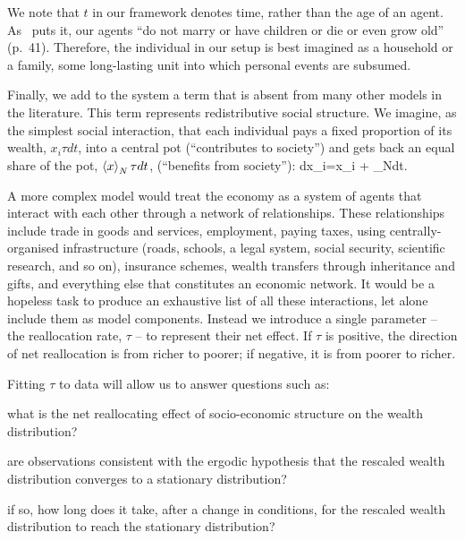 We note that $t$ in our framework denotes time, rather than the age of an agent. As~\cite{meade1964efficiency} puts it, our agents ``do not marry or have children or die or even grow old'' (p.~41). Therefore, the individual in our setup is best imagined as a household or a family, \ie some long-lasting unit into which personal events are subsumed.

Finally, we add to the system a term that is absent from many other models in the literature. This term represents redistributive social structure. We imagine, as the simplest social interaction, that each individual pays a fixed proportion of its wealth, $x_i \tau dt$, into a central pot (``contributes to society'') and gets back an equal share of the pot, $\left\langle x \right\rangle_N\tau dt$, (``benefits from society''):
\be
dx_i=x_i + _N\tau dt.
\ee

A more complex model would treat the economy as a system of agents that interact with each other through a network of relationships. These relationships include trade in goods and services, employment, paying taxes, using centrally-organised infrastructure (roads, schools, a legal system, social security, scientific research, and so on), insurance schemes, wealth transfers through inheritance and gifts, and everything else that constitutes an economic network. It would be a hopeless task to produce an exhaustive list of all these interactions, let alone include them as model components. Instead we introduce a single parameter -- the reallocation rate, $\tau$ -- to represent their net effect. If $\tau$ is positive, the direction of net reallocation is from richer to poorer; if negative, it is from poorer to richer.

Fitting $\tau$ to data will allow us to answer questions such as:
\bi
\item
what is the
net reallocating effect of socio-economic structure on the wealth distribution?
\item
are observations consistent with the ergodic hypothesis that the rescaled wealth distribution converges to a stationary distribution?
\item
if so, how long does it take, after a change in conditions, for the rescaled wealth distribution to reach the stationary distribution?
\ei

